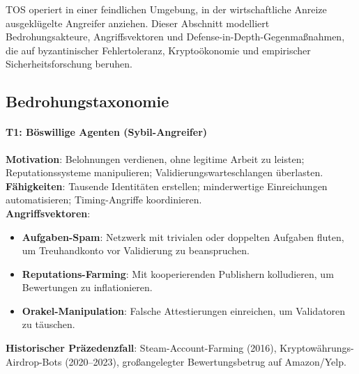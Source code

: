 \documentclass[11pt]{article}
\begin{document}
TOS operiert in einer feindlichen Umgebung, in der wirtschaftliche Anreize ausgeklügelte Angreifer anziehen. Dieser Abschnitt modelliert Bedrohungsakteure, Angriffsvektoren und Defense-in-Depth-Gegenmaßnahmen, die auf byzantinischer Fehlertoleranz, Kryptoökonomie und empirischer Sicherheitsforschung beruhen.

\subsection{Bedrohungstaxonomie}

\paragraph{T1: Böswillige Agenten (Sybil-Angreifer)}
\textbf{Motivation}: Belohnungen verdienen, ohne legitime Arbeit zu leisten; Reputationssysteme manipulieren; Validierungswarteschlangen überlasten.\\
\textbf{Fähigkeiten}: Tausende Identitäten erstellen; minderwertige Einreichungen automatisieren; Timing-Angriffe koordinieren.\\
\textbf{Angriffsvektoren}:
\begin{itemize}[noitemsep]
  \item \textbf{Aufgaben-Spam}: Netzwerk mit trivialen oder doppelten Aufgaben fluten, um Treuhandkonto vor Validierung zu beanspruchen.
  \item \textbf{Reputations-Farming}: Mit kooperierenden Publishern kolludieren, um Bewertungen zu inflationieren.
  \item \textbf{Orakel-Manipulation}: Falsche Attestierungen einreichen, um Validatoren zu täuschen.
\end{itemize}
\textbf{Historischer Präzedenzfall}: Steam-Account-Farming (2016), Kryptowährungs-Airdrop-Bots (2020--2023), großangelegter Bewertungsbetrug auf Amazon/Yelp.
\end{document}
